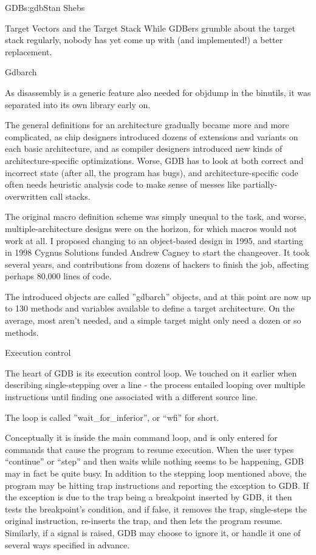\begin{aosachapter}{GDB}{s:gdb}{Stan Shebs}
\begin{aosasect1}{Target Vectors and the Target Stack}
While GDBers grumble about the target stack regularly, nobody has yet
come up with (and implemented!) a better replacement.

\end{aosasect1}

\begin{aosasect1}{Gdbarch}

As disassembly is a generic feature also needed for objdump in the
binutils, it was separated into its own library early on.

The general definitions for an architecture gradually became more and
more complicated, as chip designers introduced dozens of extensions
and variants on each basic architecture, and as compiler designers
introduced new kinds of architecture-specific optimizations.  Worse,
GDB has to look at both correct and incorrect state (after all, the
program has bugs), and architecture-specific code often needs
heuristic analysis code to make sense of messes like
partially-overwritten call stacks.

The original macro definition scheme was simply unequal to the task,
and worse, multiple-architecture designs were on the horizon, for
which macros would not work at all.  I proposed changing to an
object-based design in 1995, and starting in 1998 Cygnus Solutions
funded Andrew Cagney to start the changeover.  It took several years,
and contributions from dozens of hackers to finish the job, affecting
perhaps 80,000 lines of code.

The introduced objects are called ''gdbarch'' objects, and at this
point are now up to 130 methods and variables available to define a
target architecture.  On the average, most aren't needed, and a
simple target might only need a dozen or so methods.

\end{aosasect1}

\begin{aosasect1}{Execution control}

The heart of GDB is its execution control loop.  We touched on it earlier
when describing single-stepping over a line - the process entailed looping
over multiple instructions until finding one associated with a different
source line.

The loop is called ''wait\_for\_inferior'', or ``wfi'' for short.

Conceptually it is inside the main command loop, and is only entered for
commands that cause the program to resume execution.  When the user types
``continue'' or ``step'' and then waits while nothing seems to be happening,
GDB may in fact be quite busy.  In addition to the stepping loop mentioned
above, the program may be hitting trap instructions and reporting the exception
to GDB.  If the exception is due to the trap being a breakpoint inserted by
GDB, it then tests the breakpoint's condition, and if false, it removes the
trap, single-steps the original instruction, re-inserts the trap, and then
lets the program resume.  Similarly, if a signal is raised, GDB may choose
to ignore it, or handle it one of several ways specified in advance.


\end{aosasect1}
\end{aosachapter}
